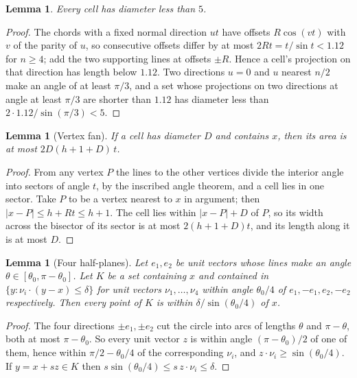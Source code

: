 \documentclass[11pt]{amsart}
\newtheorem{lemma}[theorem]{Lemma}
\theoremstyle{remark}
\begin{document}
\begin{lemma}\label{lem:diam}
Every cell has diameter less than $5$.
\end{lemma}

\begin{proof}
The chords with a fixed normal direction $ut$ have offsets $R\cos(vt)$ with $v$ of the parity of $u$, so consecutive offsets differ by at most $2Rt=t/\sin t<1.12$ for $n\ge4$; add the two supporting lines at offsets $\pm R$. Hence a cell's projection on that direction has length below $1.12$. Two directions $u=0$ and $u$ nearest $n/2$ make an angle of at least $\pi/3$, and a set whose projections on two directions at angle at least $\pi/3$ are shorter than $1.12$ has diameter less than $2\cdot1.12/\sin(\pi/3)<5$.
\end{proof}

\begin{lemma}[Vertex fan]\label{lem:fan}
If a cell has diameter $D$ and contains $x$, then its area is at most $2D(h+1+D)\,t$.
\end{lemma}

\begin{proof}
From any vertex $P$ the lines to the other vertices divide the interior angle into sectors of angle $t$, by the inscribed angle theorem, and a cell lies in one sector. Take $P$ to be a vertex nearest to $x$ in argument; then $|x-P|\le h+Rt\le h+1$. The cell lies within $|x-P|+D$ of $P$, so its width across the bisector of its sector is at most $2(h+1+D)t$, and its length along it is at most $D$.
\end{proof}

\begin{lemma}[Four half-planes]\label{lem:trap}
Let $e_1,e_2$ be unit vectors whose lines make an angle $\theta\in[\theta_0,\pi-\theta_0]$. Let $K$ be a set containing $x$ and contained in $\{y:\nu_i\cdot(y-x)\le\delta\}$ for unit vectors $\nu_1,\dots,\nu_4$ within angle $\theta_0/4$ of $e_1,-e_1,e_2,-e_2$ respectively. Then every point of $K$ is within $\delta/\sin(\theta_0/4)$ of $x$.
\end{lemma}

\begin{proof}
The four directions $\pm e_1,\pm e_2$ cut the circle into arcs of lengths $\theta$ and $\pi-\theta$, both at most $\pi-\theta_0$. So every unit vector $z$ is within angle $(\pi-\theta_0)/2$ of one of them, hence within $\pi/2-\theta_0/4$ of the corresponding $\nu_i$, and $z\cdot\nu_i\ge\sin(\theta_0/4)$. If $y=x+sz\in K$ then $s\sin(\theta_0/4)\le s\,z\cdot\nu_i\le\delta$.
\end{proof}
\end{document}
